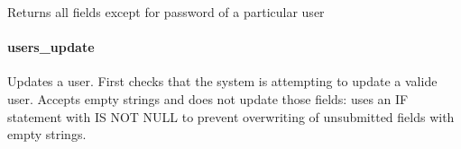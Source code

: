 Returns all fields except for password of a particular user

\begin{Shaded}
\begin{Highlighting}[]
  \NormalTok{(}\NormalTok{))}
    
\end{Highlighting}
\end{Shaded}

\paragraph{users\_update}\label{usersux5fupdate}

Updates a user. First checks that the system is attempting to update a
valide user. Accepts empty strings and does not update those fields:
uses an IF statement with IS NOT NULL to prevent overwriting of
unsubmitted fields with empty strings.


